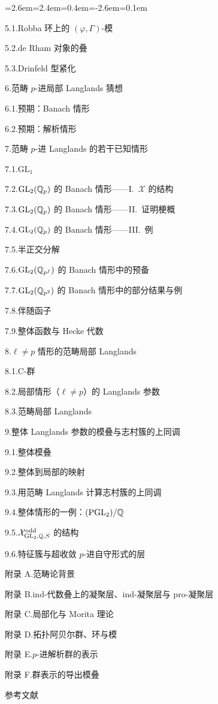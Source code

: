 \begin{list}{}{\leftmargin=2.6em=2.4em=0.4em\itemindent=-2.6em\itemsep=0.1em}
\item 5.1.\quad Robba 环上的 $(\varphi,\Gamma)$-模
\item 5.2.\quad de Rham 对象的叠
\item 5.3.\quad Drinfeld 型紧化
\item 6.\quad 范畴 $p$-进局部 Langlands 猜想
\item 6.1.\quad 预期：Banach 情形
\item 6.2.\quad 预期：解析情形
\item 7.\quad 范畴 $p$-进 Langlands 的若干已知情形
\item 7.1.\quad $\mathrm{GL}_1$
\item 7.2.\quad $\mathrm{GL}_2(\mathbb{Q}_p)$ 的 Banach 情形——I.\ $\mathcal X$ 的结构
\item 7.3.\quad $\mathrm{GL}_2(\mathbb{Q}_p)$ 的 Banach 情形——II.\ 证明梗概
\item 7.4.\quad $\mathrm{GL}_2(\mathbb{Q}_p)$ 的 Banach 情形——III.\ 例
\item 7.5.\quad 半正交分解
\item 7.6.\quad $\mathrm{GL}_2(\mathbb{Q}_{p^f})$ 的 Banach 情形中的预备
\item 7.7.\quad $\mathrm{GL}_2(\mathbb{Q}_{p^2})$ 的 Banach 情形中的部分结果与例
\item 7.8.\quad 伴随函子
\item 7.9.\quad 整体函数与 Hecke 代数
\item 8.\quad $\ell\neq p$ 情形的范畴局部 Langlands
\item 8.1.\quad C-群
\item 8.2.\quad 局部情形（$\ell\neq p$）的 Langlands 参数
\item 8.3.\quad 范畴局部 Langlands
\item 9.\quad 整体 Langlands 参数的模叠与志村簇的上同调
\item 9.1.\quad 整体模叠
\item 9.2.\quad 整体到局部的映射
\item 9.3.\quad 用范畴 Langlands 计算志村簇的上同调
\item 9.4.\quad 整体情形的一例：$(\mathrm{PGL}_2)/\mathbb{Q}$
\item 9.5.\quad $\mathcal X^{\mathrm{odd}}_{\mathrm{GL}_2,\mathbb{Q},S}$ 的结构
\item 9.6.\quad 特征簇与超收敛 $p$-进自守形式的层
\item 附录 A.\quad 范畴论背景
\item 附录 B.\quad ind-代数叠上的凝聚层、ind-凝聚层与 pro-凝聚层
\item 附录 C.\quad 局部化与 Morita 理论
\item 附录 D.\quad 拓扑阿贝尔群、环与模
\item 附录 E.\quad $p$-进解析群的表示
\item 附录 F.\quad 群表示的导出模叠
\item 参考文献
\end{list}

